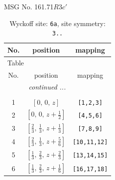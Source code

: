 \documentclass[fleqn,8pt]{jsarticle}
\begin{document}
\setcounter{MaxMatrixCols}{32}

\renewcommand{\tablename}{Table~}
\renewcommand{\figurename}{Figure~}
\begin{center}
\LARGE
MSG No. 161.71\quad$R3c'$
\end{center}
\renewcommand{\arraystretch}{1.2}
\begin{longtable}{ccc}
\caption{Wyckoff site: {\tt 6a}, site symmetry: {\tt 3..}}
 \\
 \hline \hline
No. & position & mapping \\ \hline \endfirsthead

\multicolumn{2}{l}{\tablename\ \thetable{}} \\
 \hline \hline
No. & position & mapping \\ \hline \endhead

 \hline \hline
\multicolumn{2}{r}{\footnotesize\it continued ...} \\ \endfoot

 \hline \hline
\multicolumn{2}{r}{} \\ \endlastfoot

1 & $\left[ 0,\, 0,\, z \right]$ & {\tt [1,2,3]} \\ \hline
2 & $\left[ 0,\, 0,\, z + \frac{1}{2} \right]$ & {\tt [4,5,6]} \\ \hline
3 & $\left[ \frac{2}{3},\, \frac{1}{3},\, z + \frac{1}{3} \right]$ & {\tt [7,8,9]} \\ \hline
4 & $\left[ \frac{2}{3},\, \frac{1}{3},\, z + \frac{5}{6} \right]$ & {\tt [10,11,12]} \\ \hline
5 & $\left[ \frac{1}{3},\, \frac{2}{3},\, z + \frac{2}{3} \right]$ & {\tt [13,14,15]} \\ \hline
6 & $\left[ \frac{1}{3},\, \frac{2}{3},\, z + \frac{1}{6} \right]$ & {\tt [16,17,18]} \\
\end{longtable}
\renewcommand{\arraystretch}{1.2}
\end{document}
